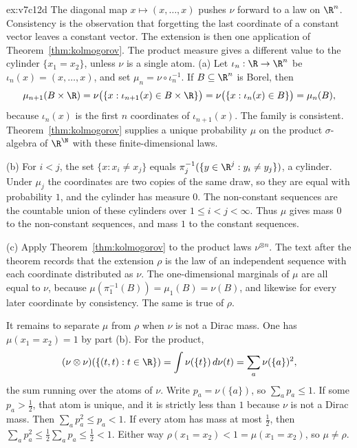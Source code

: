 \begin{solution}{ex:v7c12d}
\idea The diagonal map $x\mapsto(x,\ldots,x)$ pushes $\nu$ forward to a law on $\R^n$. Consistency is the observation that forgetting the last
coordinate of a constant vector leaves a constant vector. The extension is then one application of Theorem~\ref{thm:kolmogorov}. The product
measure gives a different value to the cylinder $\{x_1=x_2\}$, unless $\nu$ is a single atom.
\writeup (a) Let $\iota_n:\R\to\R^n$ be $\iota_n(x)=(x,\ldots,x)$, and set $\mu_n=\nu\circ\iota_n^{-1}$. If $B\subseteq\R^n$ is Borel, then
\[\mu_{n+1}(B\times\R)=\nu\bigl(\{x:\iota_{n+1}(x)\in B\times\R\}\bigr)=\nu\bigl(\{x:\iota_n(x)\in B\}\bigr)=\mu_n(B),\]
because $\iota_n(x)$ is the first $n$ coordinates of $\iota_{n+1}(x)$. The family is consistent. Theorem~\ref{thm:kolmogorov} supplies a unique
probability $\mu$ on the product $\sigma$-algebra of $\R^\N$ with these finite-dimensional laws.

(b) For $i<j$, the set $\{x:x_i\ne x_j\}$ equals $\pi_j^{-1}(\{y\in\R^j:y_i\ne y_j\})$, a cylinder. Under $\mu_j$ the coordinates are two copies of
the same draw, so they are equal with probability $1$, and the cylinder has measure $0$. The non-constant sequences are the countable union of
these cylinders over $1\le i<j<\infty$. Thus $\mu$ gives mass $0$ to the non-constant sequences, and mass $1$ to the constant sequences.

(c) Apply Theorem~\ref{thm:kolmogorov} to the product laws $\nu^{\otimes n}$. The text after the theorem records that the extension $\rho$ is
the law of an independent sequence with each coordinate distributed as $\nu$. The one-dimensional marginals of $\mu$ are all equal to $\nu$,
because $\mu(\pi_1^{-1}(B))=\mu_1(B)=\nu(B)$, and likewise for every later coordinate by consistency. The same is true of $\rho$.

It remains to separate $\mu$ from $\rho$ when $\nu$ is not a Dirac mass. One has $\mu(x_1=x_2)=1$ by part (b). For the product,
\[(\nu\otimes\nu)(\{(t,t):t\in\R\})=\int\nu(\{t\})\,d\nu(t)=\sum_a\nu(\{a\})^2,\]
the sum running over the atoms of $\nu$. Write $p_a=\nu(\{a\})$, so $\sum_a p_a\le 1$. If some $p_a>\frac12$, that atom is unique, and it is
strictly less than $1$ because $\nu$ is not a Dirac mass. Then $\sum_a p_a^2\le p_a<1$. If every atom has mass at most $\frac12$, then
$\sum_a p_a^2\le\frac12\sum_a p_a\le\frac12<1$. Either way $\rho(x_1=x_2)<1=\mu(x_1=x_2)$, so $\mu\ne\rho$.
\end{solution}

